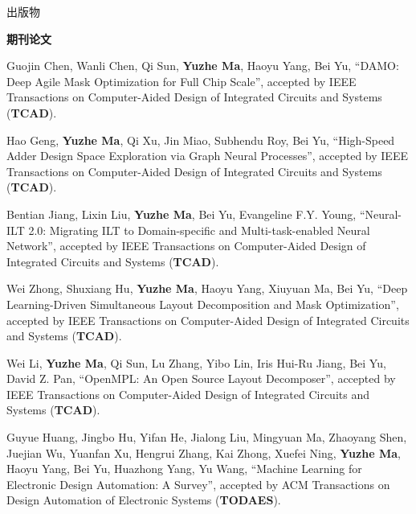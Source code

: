 \begin{rSection}{出版物}

\iffalse
\textbf{Books / Book Chapters}
\begin{description}[font=\normalfont]

\end{description}
\fi

\textbf{期刊论文}
\begin{description}[font=\normalfont]
\iffalse
\item \textbf{Submitted}

\fi


\item[{[J15]}] {
    Guojin Chen, Wanli Chen, Qi Sun, \textbf{Yuzhe Ma}, Haoyu Yang, Bei Yu,
    ``DAMO: Deep Agile Mask Optimization for Full Chip Scale'',
    accepted by IEEE Transactions on Computer-Aided Design of Integrated Circuits and Systems (\textbf{TCAD}).
}


\item[{[J14]}] {
    Hao Geng, \textbf{Yuzhe Ma}, Qi Xu, Jin Miao, Subhendu Roy, Bei Yu,
    ``High-Speed Adder Design Space Exploration via Graph Neural Processes'',
    accepted by IEEE Transactions on Computer-Aided Design of Integrated Circuits and Systems (\textbf{TCAD}).
}


\item[{[J13]}] {
    Bentian Jiang, Lixin Liu, \textbf{Yuzhe Ma}, Bei Yu, Evangeline F.Y. Young,
    ``Neural-ILT 2.0: Migrating ILT to Domain-specific and Multi-task-enabled Neural Network'',
    accepted by IEEE Transactions on Computer-Aided Design of Integrated Circuits and Systems (\textbf{TCAD}).
}

\item[{[J12]}] {
    Wei Zhong, Shuxiang Hu, \textbf{Yuzhe Ma}, Haoyu Yang, Xiuyuan Ma, Bei Yu,
    ``Deep Learning-Driven Simultaneous Layout Decomposition and Mask Optimization'',
    accepted by IEEE Transactions on Computer-Aided Design of Integrated Circuits and Systems (\textbf{TCAD}).
}

\item[{[J11]}]{
    Wei Li, \textbf{Yuzhe Ma}, Qi Sun, Lu Zhang, Yibo Lin, Iris Hui-Ru Jiang, Bei Yu, David Z. Pan,
    ``OpenMPL: An Open Source Layout Decomposer'',
    accepted by IEEE Transactions on Computer-Aided Design of Integrated Circuits and Systems (\textbf{TCAD}).
}

\item[{[J10]}] {
    Guyue Huang, Jingbo Hu, Yifan He, Jialong Liu, Mingyuan Ma, Zhaoyang Shen, Juejian Wu, Yuanfan Xu, Hengrui Zhang, Kai Zhong, Xuefei Ning, \textbf{Yuzhe Ma}, Haoyu Yang, Bei Yu, Huazhong Yang, Yu Wang,
    ``Machine Learning for Electronic Design Automation: A Survey'',
    accepted by ACM Transactions on Design Automation of Electronic Systems (\textbf{TODAES}).
}


\end{description}
\end{rSection}
